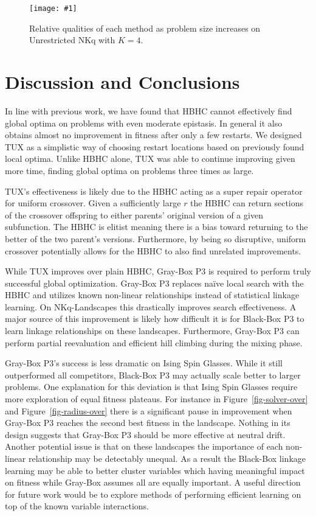 \documentclass{sig-alternate}
\newcommand{\includegraphicsfit}[1]
{\texttt{[image: \#1]}}
\begin{document}
\begin{figure}
  \centering
  \includegraphicsfit{length-un}
  \caption{Relative qualities of each method as problem size increases on Unrestricted NKq
  with $K=4$.}
  \label{fig-length-un}
\end{figure}

\section{Discussion and Conclusions}
In line with previous work, we have found that HBHC cannot effectively find global optima
on problems with even moderate epistasis. In general it also obtains almost no improvement
in fitness after only a few restarts. We designed TUX as a simplistic way of choosing
restart locations based on previously found local optima. Unlike HBHC alone, TUX
was able to continue improving given more time, finding global optima on problems three
times as large.

TUX's effectiveness is likely due to the HBHC acting as a super repair operator for uniform crossover.
Given a sufficiently large $r$ the HBHC can return sections of the crossover offspring to either
parents' original version of a given subfunction. The HBHC is elitist meaning there is a bias toward
returning to the better of the two parent's versions. Furthermore, by being so disruptive,
uniform crossover potentially allows for the HBHC to also find unrelated improvements.

While TUX improves over plain HBHC, Gray-Box P3 is required to perform truly successful
global optimization. Gray-Box P3 replaces na\"{i}ve local search with the HBHC and utilizes
known non-linear relationships instead of statistical linkage learning. On NKq-Landscapes this drastically
improves search effectiveness. A major source of this improvement is likely how difficult it is
for Black-Box P3 to learn linkage relationships on these landscapes. Furthermore, Gray-Box P3
can perform partial reevaluation and efficient hill climbing during the mixing phase.

Gray-Box P3's success is less dramatic on Ising Spin Glasses.
While it still outperformed all competitors, Black-Box P3 may actually scale better to larger
problems. One explanation for this deviation is that Ising Spin Glasses require more
exploration of equal fitness plateaus. For instance in Figure~\ref{fig-solver-over} and Figure~\ref{fig-radius-over}
there is a significant pause in improvement when Gray-Box P3 reaches the second best fitness in the landscape.
Nothing in its design suggests that Gray-Box P3 should be more effective at neutral drift. Another potential
issue is that on these landscapes the importance of each non-linear relationship may be detectably unequal.
As a result the Black-Box linkage learning may be able to better cluster variables which having meaningful
impact on fitness while Gray-Box assumes all are equally important. A useful direction for future work
would be to explore methods of performing efficient learning on top of the known variable interactions.
\end{document}

